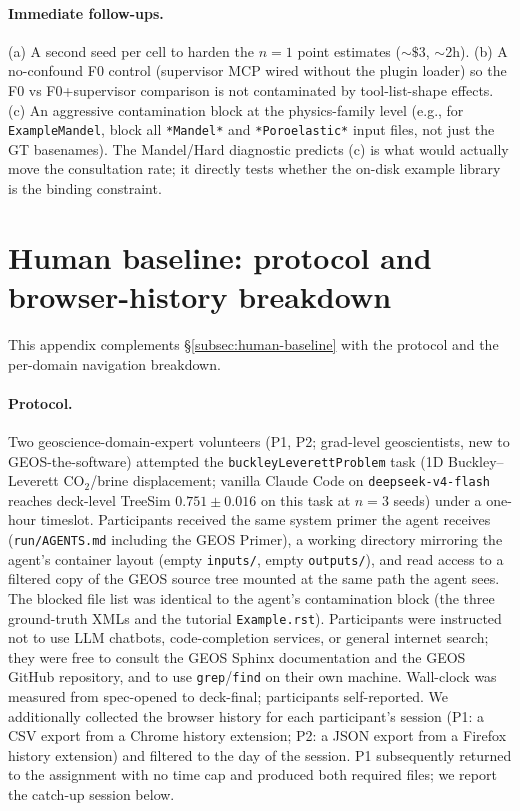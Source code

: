 \documentclass{article}
\begin{document}
\paragraph{Immediate follow-ups.} (a) A second seed per cell to harden the $n=1$ point estimates ($\sim\$3$, $\sim$2h). (b) A no-confound F0 control (supervisor MCP wired without the plugin loader) so the F0 vs F0+supervisor comparison is not contaminated by tool-list-shape effects. (c) An aggressive contamination block at the physics-family level (e.g., for \texttt{ExampleMandel}, block all \texttt{*Mandel*} and \texttt{*Poroelastic*} input files, not just the GT basenames). The Mandel/Hard diagnostic predicts (c) is what would actually move the consultation rate; it directly tests whether the on-disk example library is the binding constraint.

\section{Human baseline: protocol and browser-history breakdown}
\label{app:human-browser}

This appendix complements \S\ref{subsec:human-baseline} with the protocol and the per-domain navigation breakdown.

\paragraph{Protocol.} Two geoscience-domain-expert volunteers (P1, P2; grad-level geoscientists, new to GEOS-the-software) attempted the \texttt{buckleyLeverettProblem} task (1D Buckley--Leverett CO$_2$/brine displacement; vanilla Claude Code on \texttt{deepseek-v4-flash} reaches deck-level TreeSim $0.751 \pm 0.016$ on this task at $n=3$ seeds) under a one-hour timeslot. Participants received the same system primer the agent receives (\texttt{run/AGENTS.md} including the GEOS Primer), a working directory mirroring the agent's container layout (empty \texttt{inputs/}, empty \texttt{outputs/}), and read access to a filtered copy of the GEOS source tree mounted at the same path the agent sees. The blocked file list was identical to the agent's contamination block (the three ground-truth XMLs and the tutorial \texttt{Example.rst}). Participants were instructed not to use LLM chatbots, code-completion services, or general internet search; they were free to consult the GEOS Sphinx documentation and the GEOS GitHub repository, and to use \texttt{grep}/\texttt{find} on their own machine. Wall-clock was measured from spec-opened to deck-final; participants self-reported. We additionally collected the browser history for each participant's session (P1: a CSV export from a Chrome history extension; P2: a JSON export from a Firefox history extension) and filtered to the day of the session. P1 subsequently returned to the assignment with no time cap and produced both required files; we report the catch-up session below.
\end{document}
